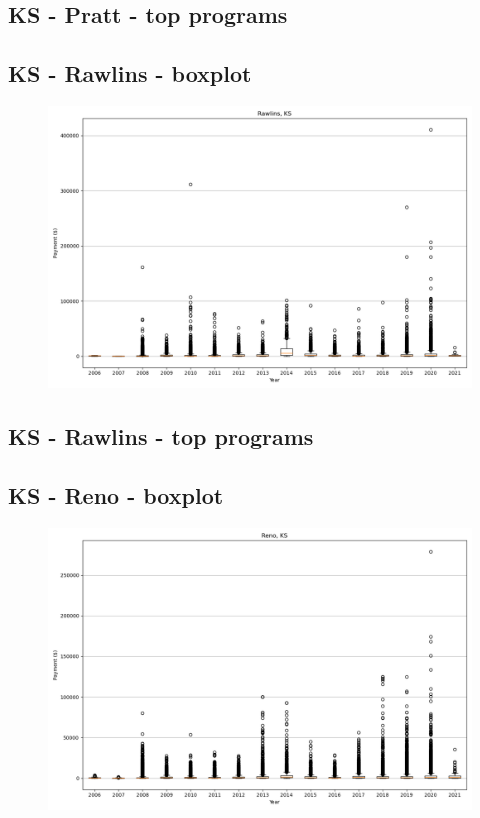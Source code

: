 \subsection*{KS - Pratt - top programs}

\newpage
\subsection*{KS - Rawlins - boxplot}
\begin{figure}[h]
\centering
\includegraphics[width=7in]{../output/boxplots/counties/Rawlins-KS_boxplot.png}
\end{figure}


\subsection*{KS - Rawlins - top programs}

\newpage
\subsection*{KS - Reno - boxplot}
\begin{figure}[h]
\centering
\includegraphics[width=7in]{../output/boxplots/counties/Reno-KS_boxplot.png}
\end{figure}


